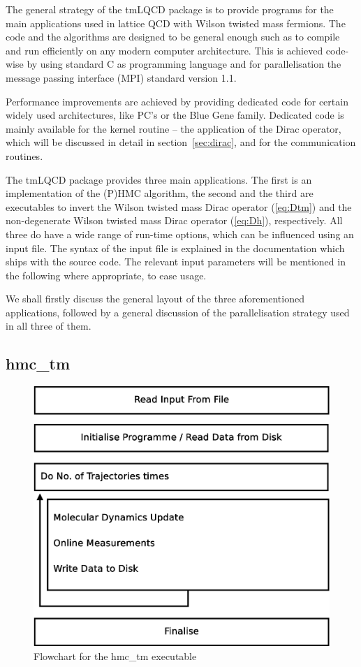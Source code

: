 The general strategy of the tmLQCD package is to provide programs for
the main applications used in lattice QCD with Wilson twisted mass
fermions. The code and the algorithms are designed to be general
enough such as to compile and run efficiently on any modern computer 
architecture. This is achieved code-wise by using standard C as
programming language and for parallelisation the message passing
interface (MPI) standard version 1.1.

Performance improvements are achieved by providing dedicated code for
certain widely used architectures, like PC's or the Blue Gene family. 
Dedicated code is mainly available for the kernel routine -- the
application of the Dirac operator, which will be discussed in
detail in section~\ref{sec:dirac}, and for the communication
routines.

The tmLQCD package provides three main applications. The first is an
implementation of the (P)HMC algorithm, the second and the third are
executables to invert the Wilson twisted mass Dirac operator
(\ref{eq:Dtm}) and the non-degenerate Wilson twisted mass Dirac operator
(\ref{eq:Dh}), respectively. All three do have a wide range of
run-time options, which can be influenced using an input file. The
syntax of the input file is explained in the documentation which ships
with the source code. The relevant input parameters will be mentioned
in the following where appropriate, to ease usage.

We shall firstly discuss the general layout of the three
aforementioned applications, followed by a general discussion of the
parallelisation strategy used in all three of them.

\subsection{{\ttfamily hmc\_tm}}

\begin{figure}[t]
  \centering
  \includegraphics[width=0.7\linewidth]{hmcflow.eps}
  \caption{Flowchart for the {\ttfamily hmc\_tm} executable}
  \label{fig:hmcflow}
\end{figure}

